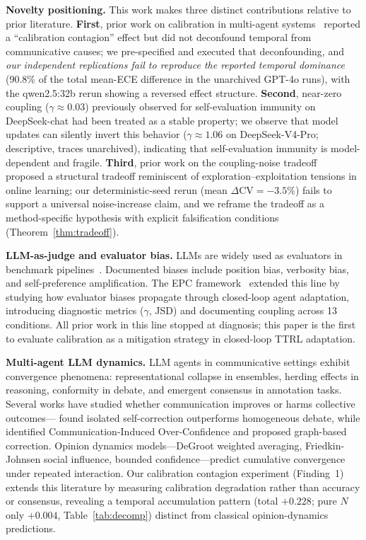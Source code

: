 \documentclass[11pt]{article}
\newcommand{\CV}{\ensuremath{\mathrm{CV}}}
\theoremstyle{definition}
\theoremstyle{remark}
\begin{document}
\textbf{Novelty positioning.} This work makes three distinct contributions relative to prior literature. \textbf{First}, prior work on calibration in multi-agent systems~\citep{huang2026cagecal,epc2026} reported a ``calibration contagion'' effect but did not deconfound temporal from communicative causes; we pre-specified and executed that deconfounding, and \emph{our independent replications fail to reproduce the reported temporal dominance} (90.8\% of the total mean-ECE difference in the unarchived GPT-4o runs), with the qwen2.5:32b rerun showing a reversed effect structure. \textbf{Second}, near-zero coupling ($\gamma \approx 0.03$) previously observed for self-evaluation immunity on DeepSeek-chat had been treated as a stable property; we observe that model updates can silently invert this behavior ($\gamma \approx 1.06$ on DeepSeek-V4-Pro; descriptive, traces unarchived), indicating that self-evaluation immunity is model-dependent and fragile. \textbf{Third}, prior work on the coupling-noise tradeoff~\citep{caleffects2026,bubeck2012regret} proposed a structural tradeoff reminiscent of exploration--exploitation tensions in online learning; our deterministic-seed rerun (mean $\Delta\CV = -3.5\%$) fails to support a universal noise-increase claim, and we reframe the tradeoff as a method-specific hypothesis with explicit falsification conditions (Theorem~\ref{thm:tradeoff}).

\textbf{LLM-as-judge and evaluator bias.} LLMs are widely used as evaluators in benchmark pipelines~\citep{zheng2023judging,chiang2024chatbot}. Documented biases include position bias, verbosity bias, and self-preference amplification. The EPC framework~\citep{epc2026} extended this line by studying how evaluator biases propagate through closed-loop agent adaptation, introducing diagnostic metrics ($\gamma$, JSD) and documenting coupling across 13 conditions. All prior work in this line stopped at diagnosis; this paper is the first to evaluate calibration as a mitigation strategy in closed-loop TTRL adaptation.

\textbf{Multi-agent LLM dynamics.} LLM agents in communicative settings exhibit convergence phenomena: representational collapse in ensembles, herding effects in reasoning, conformity in debate, and emergent consensus in annotation tasks. Several works have studied whether communication improves or harms collective outcomes---\citet{bertalanic2026cost} found isolated self-correction outperforms homogeneous debate, while \citet{huang2026cagecal} identified Communication-Induced Over-Confidence and proposed graph-based correction. Opinion dynamics models---DeGroot weighted averaging, Friedkin-Johnsen social influence, bounded confidence---predict cumulative convergence under repeated interaction. Our calibration contagion experiment (Finding~1) extends this literature by measuring calibration degradation rather than accuracy or consensus, revealing a temporal accumulation pattern (total $+0.228$; pure $N$ only $+0.004$, Table~\ref{tab:decomp}) distinct from classical opinion-dynamics predictions.
\end{document}
